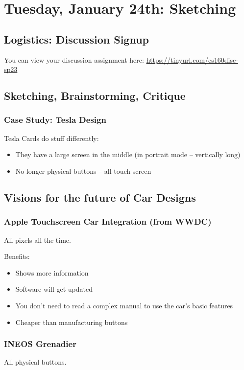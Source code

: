 \section{Tuesday, January 24th: Sketching}
\subsection{Logistics: Discussion Signup}
You can view your discussion assignment here: \href{https://tinyurl.com/cs160disc-sp23}{https://tinyurl.com/cs160disc-sp23}

\subsection{Sketching, Brainstorming, Critique}
\subsubsection{Case Study: Tesla Design}
Tesla Cards do stuff differently:
\begin{itemize}
    \item They have a large screen in the middle (in portrait mode -- vertically long)
    \item No longer physical buttons -- all touch screen
\end{itemize}

\subsection{Visions for the future of Car Designs}
\subsubsection{Apple Touchscreen Car Integration (from WWDC)}
All pixels all the time.

Benefits:
\begin{itemize}
    \item Shows more information
    \item Software will get updated
    \item You don't need to read a complex manual to use the car's basic features
    \item Cheaper than manufacturing buttons
\end{itemize}

\subsubsection{INEOS Grenadier}
All physical buttons.

